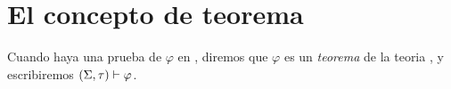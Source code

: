 \section{El concepto de teorema}
\begin{definition}
  Cuando haya una prueba de $\varphi$ en \forder, diremos que $\varphi$ es un \emph{teorema} de la teoria \forder, y escribiremos $(\Sigma,\tau)\vdash\varphi$.
\end{definition}
